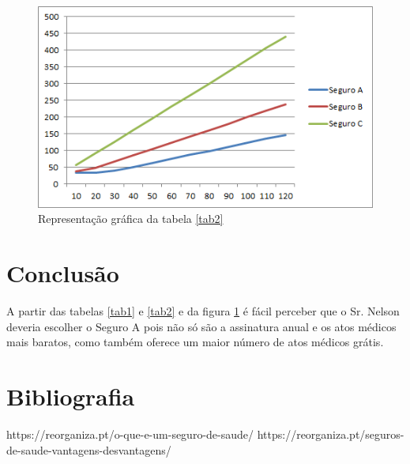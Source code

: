 \documentclass[11pt,a4paper,titlepage]{article}
\begin{document}
\begin{figure}[!h]
\centering
\includegraphics[scale=0.8]{Graph.png}
\caption{Representação gráfica da tabela \ref{tab2}}
\label{fig1}
\end{figure}
\newpage
\section{Conclusão}
A partir das tabelas \ref{tab1} e \ref{tab2} e da figura \ref{fig1} é fácil perceber que o Sr. Nelson deveria escolher o Seguro A pois não só são a assinatura anual e os atos médicos mais baratos, como também oferece um maior número de atos médicos grátis.
\newpage
\section{Bibliografia}
\begin{thebibliography}{9}
 https://reorganiza.pt/o-que-e-um-seguro-de-saude/
 https://reorganiza.pt/seguros-de-saude-vantagens-desvantagens/
\end{thebibliography}
\end{document}
